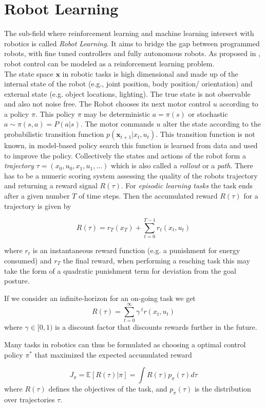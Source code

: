 \section{Robot Learning}
The sub-field where reinforcement learning and machine learning
intersect with robotics is called \textit{Robot Learning}. It aims to bridge
the gap between programmed robots,
with fine tuned controllers  and fully autonomous robots.
As proposed in \citet{deisenroth2013survey}, robot control can be modeled as
a reinforcement learning problem.  \\
The state space $\mathbf{x}$ in robotic tasks is high dimensional and made up of
the internal state of the robot (e.g., joint position, body position/ orientation)
and external state (e.g. object locations, lighting). The true state is
not observable and also not noise free. 
The Robot chooses its next motor control $u$ according to a policy $\pi$.
This policy $\pi$ may
be deterministic $a = \pi(s)$ or stochastic $a \sim \pi(s,a) = P(a | s)$.
The motor commands $u$ alter the state according to the probabilistic
transition function $p(\mathbf{x}_{t+1} | x_t, u_t)$. This transition function
is not known, in model-based policy search this function is learned from data and
used to improve the policy.
Collectively the states and actions of the robot form a
\textit{trajectory} $\tau = (x_0, u_0, x_1, u_1,...)$ which is also called
a \textit{rollout} or a \textit{path}.
There has to be a numeric scoring system assessing the quality
of the robots trajectory and returning a reward signal $R(\tau)$.
For \textit{episodic learning tasks} the task ends after a given number $T$ of time
steps. Then the accumulated reward $R(\tau)$ for a trajectory is given by

$$ R(\tau) = r_T(x_T) + \sum^{T-1}_{t=0} r_t(x_t,u_t) $$

where $r_t$ is an instantaneous reward function (e.g. a punishment for energy consumed)
and $r_T$ the final reward, when performing a reaching task this may take the
form of a quadratic punishment term for deviation from the goal posture.

If we consider an infinite-horizon for an on-going task we get
$$ R(\tau) = \sum^{\infty}_{t=0} \gamma^{\; t} r(x_t, u_t) $$
where $\gamma \in [0,1)$ is a discount factor that discounts rewards further in the future.

Many tasks in robotics can thus be formulated as choosing a optimal control
policy $\pi^*$ that maximized the expected accumulated reward

$$ J_{\pi} = \mathbb{E}[R(\tau) | \pi] = \int R(\tau) p_{\pi}(\tau) d\tau $$
where $R(\tau)$ defines the objectives of the task, and $p_{\pi}(\tau)$ is the
distribution over trajectories $\tau$.

